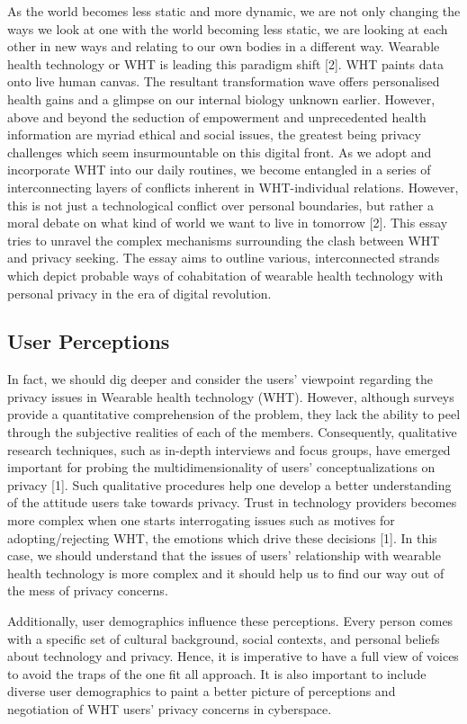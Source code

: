 \documentclass[11pt]{article}
\begin{document}
As the world becomes less static and more dynamic, we are not only changing the ways we look at one with the world becoming less static, we are looking at each other in new ways and relating to our own bodies in a different way. Wearable health technology or WHT is leading this paradigm shift [2]. WHT paints data onto live human canvas. The resultant transformation wave offers personalised health gains and a glimpse on our internal biology unknown earlier. However, above and beyond the seduction of empowerment and unprecedented health information are myriad ethical and social issues, the greatest being privacy challenges which seem insurmountable on this digital front. As we adopt and incorporate WHT into our daily routines, we become entangled in a series of interconnecting layers of conflicts inherent in WHT-individual relations. However, this is not just a technological conflict over personal boundaries, but rather a moral debate on what kind of world we want to live in tomorrow [2]. This essay tries to unravel the complex mechanisms surrounding the clash between WHT and privacy seeking. The essay aims to outline various, interconnected strands which depict probable ways of cohabitation of wearable health technology with personal privacy in the era of digital revolution.

\subsection{User Perceptions}

In fact, we should dig deeper and consider the users’ viewpoint regarding the privacy issues in Wearable health technology (WHT). However, although surveys provide a quantitative comprehension of the problem, they lack the ability to peel through the subjective realities of each of the members. Consequently, qualitative research techniques, such as in-depth interviews and focus groups, have emerged important for probing the multidimensionality of users’ conceptualizations on privacy [1]. Such qualitative procedures help one develop a better understanding of the attitude users take towards privacy. Trust in technology providers becomes more complex when one starts interrogating issues such as motives for adopting/rejecting WHT, the emotions which drive these decisions [1]. In this case, we should understand that the issues of users’ relationship with wearable health technology is more complex and it should help us to find our way out of the mess of privacy concerns.

Additionally, user demographics influence these perceptions. Every person comes with a specific set of cultural background, social contexts, and personal beliefs about technology and privacy. Hence, it is imperative to have a full view of voices to avoid the traps of the one fit all approach. It is also important to include diverse user demographics to paint a better picture of perceptions and negotiation of WHT users’ privacy concerns in cyberspace.
\end{document}
